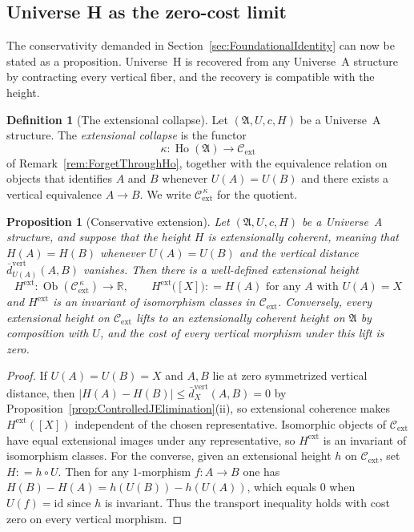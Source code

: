 \documentclass[10pt, reqno]{amsart}
\theoremstyle{plain}
\newtheorem{proposition}[theorem]{Proposition}
\theoremstyle{definition}
\newtheorem{definition}[theorem]{Definition}
\theoremstyle{plain}
\newcommand{\R}{\mathbb{R}}
\newcommand{\Ho}{\operatorname{Ho}}
\newcommand{\coloneqq}{\mathrel{\mathop:}=}
\begin{document}
\subsection{Universe H as the zero-cost limit}

The conservativity demanded in Section~\ref{sec:FoundationalIdentity} can now be stated as a proposition. Universe~H is recovered from any Universe~A structure by contracting every vertical fiber, and the recovery is compatible with the height.

\begin{definition}[The extensional collapse]\label{def:ExtensionalCollapse}
Let $(\mathfrak{A},U,c,H)$ be a Universe~A structure. The \emph{extensional collapse} is the functor
\[
  \kappa \colon \Ho(\mathfrak{A}) \longrightarrow \mathcal{C}_{\mathrm{ext}}
\]
of Remark~\ref{rem:ForgetThroughHo}, together with the equivalence relation on objects that identifies $A$ and $B$ whenever $U(A) = U(B)$ and there exists a vertical equivalence $A \to B$. We write $\mathcal{C}_{\mathrm{ext}}^{\,\kappa}$ for the quotient.
\end{definition}

\begin{proposition}[Conservative extension]\label{prop:ConservativeExtension}
Let $(\mathfrak{A},U,c,H)$ be a Universe~A structure, and suppose that the height $H$ is \emph{extensionally coherent}, meaning that $H(A) = H(B)$ whenever $U(A) = U(B)$ and the vertical distance $\bar{d}_{U(A)}^{\mathrm{vert}}(A,B)$ vanishes. Then there is a well-defined extensional height
\[
  H^{\mathrm{ext}} \colon \operatorname{Ob}(\mathcal{C}_{\mathrm{ext}}^{\,\kappa})
  \longrightarrow \R,
  \qquad
  H^{\mathrm{ext}}\bigl([X]\bigr) \coloneqq H(A) \text{ for any } A \text{ with } U(A) = X
\]
and $H^{\mathrm{ext}}$ is an invariant of isomorphism classes in $\mathcal{C}_{\mathrm{ext}}$. Conversely, every extensional height on $\mathcal{C}_{\mathrm{ext}}$ lifts to an extensionally coherent height on $\mathfrak{A}$ by composition with $U$, and the cost of every vertical morphism under this lift is zero.
\end{proposition}

\begin{proof}
If $U(A) = U(B) = X$ and $A,B$ lie at zero symmetrized vertical distance, then $|H(A) - H(B)| \le \bar{d}_X^{\mathrm{vert}}(A,B) = 0$ by Proposition~\ref{prop:ControlledJElimination}(ii), so extensional coherence makes $H^{\mathrm{ext}}([X])$ independent of the chosen representative. Isomorphic objects of $\mathcal{C}_{\mathrm{ext}}$ have equal extensional images under any representative, so $H^{\mathrm{ext}}$ is an invariant of isomorphism classes. For the converse, given an extensional height $h$ on $\mathcal{C}_{\mathrm{ext}}$, set $H \coloneqq h \circ U$. Then for any $1$-morphism $f \colon A \to B$ one has $H(B) - H(A) = h(U(B)) - h(U(A))$, which equals $0$ when $U(f) = \mathrm{id}$ since $h$ is invariant. Thus the transport inequality holds with cost zero on every vertical morphism.
\end{proof}
\end{document}
